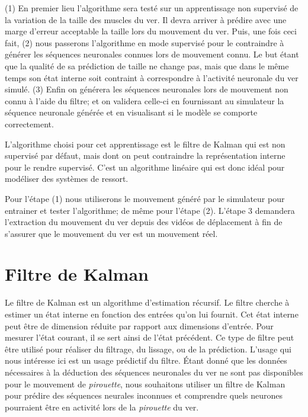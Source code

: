 (1) En premier lieu l'algorithme sera testé sur un apprentissage non supervisé
de la variation de la taille des muscles du ver.  Il devra arriver à prédire
avec une marge d'erreur acceptable la taille lors du mouvement du ver. Puis,
une fois ceci fait, (2) nous passerons l'algorithme en mode supervisé pour le
contraindre à générer les séquences neuronales connues lors de mouvement connu.
Le but étant que la qualité de sa prédiction de taille ne change pas, mais que
dans le même temps son état interne soit contraint à correspondre à l'activité
neuronale du ver simulé. (3) Enfin on générera les séquences neuronales lors de
mouvement non connu à l'aide du filtre; et on validera celle-ci en fournissant
au simulateur la séquence neuronale générée et en visualisant si le modèle se
comporte correctement.

L'algorithme choisi pour cet apprentissage est le filtre de Kalman qui est non
supervisé par défaut, mais dont on peut contraindre la représentation interne
pour le rendre supervisé. C'est un algorithme linéaire qui est donc idéal pour
modéliser des systèmes de ressort.

Pour l'étape (1) nous utiliserons le mouvement généré par le simulateur pour
entrainer et tester l'algorithme; de même pour l'étape (2). L'étape 3
demandera l'extraction du mouvement du ver depuis des vidéos de déplacement à
fin de s'assurer que le mouvement du ver est un mouvement réel.


\section{Filtre de Kalman} %
\label{sec:Filtre de Kalman}

Le filtre de Kalman est un algorithme d'estimation récursif. Le filtre cherche
à estimer un état interne en fonction des entrées qu'on lui fournit. Cet état
interne peut être de dimension réduite par rapport aux dimensions d'entrée.
Pour mesurer l'état courant, il se sert ainsi de l'état précédent. Ce type de
filtre peut être utilisé pour réaliser du filtrage, du lissage, ou de la
prédiction.  L'usage qui nous intéresse ici est un usage prédictif du filtre.
Étant donné que les données nécessaires à la déduction des séquences neuronales
du ver ne sont pas disponibles pour le mouvement de \textit{pirouette}, nous
souhaitons utiliser un filtre de Kalman pour prédire des séquences neurales
inconnues et comprendre quels neurones pourraient être en activité lors de la
\textit{pirouette} du ver.


